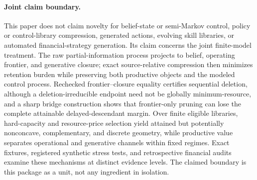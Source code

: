 \paragraph{Joint claim boundary.}
This paper does not claim novelty for belief-state or semi-Markov control,
policy or control-library compression, generated actions, evolving skill
libraries, or automated financial-strategy generation.  Its claim concerns
the joint finite-model treatment.  The raw partial-information process
projects to belief, operating frontier, and generative closure; exact
source-relative compression then minimizes retention burden while preserving
both productive objects and the modeled control process.  Rechecked
frontier--closure equality certifies sequential deletion, although a
deletion-irreducible endpoint need not be globally minimum-resource, and a
sharp bridge construction shows that frontier-only pruning can lose the
complete attainable delayed-descendant margin.  Over finite eligible
libraries, hard-capacity and resource-price selection yield attained but
potentially nonconcave, complementary, and discrete geometry, while productive
value separates operational and generative channels within fixed regimes.
Exact fixtures, registered synthetic stress tests, and retrospective financial
audits examine these mechanisms at distinct evidence levels.  The claimed
boundary is this package as a unit, not any ingredient in isolation.
